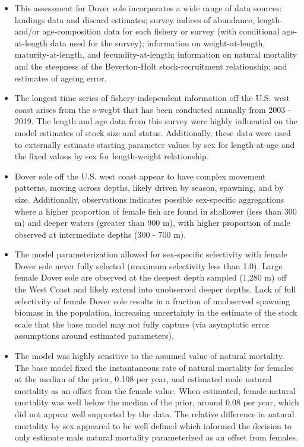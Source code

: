 \documentclass[11pt,
  english,
  a4paper,
]{article}
\begin{document}
\begin{itemize}

\item This assessment for Dover sole incorporates a wide range of data sources: landings data and discard estimates; survey indices of abundance, length- and/or age-composition data for each fishery or survey (with conditional age-at-length data used for the survey); information on weight-at-length, maturity-at-length, and fecundity-at-length; information on natural mortality and the steepness of the Beverton-Holt stock-recruitment relationship; and estimates of ageing error.

\item The longest time series of fishery-independent information off the U.S. west coast arises from the \gls{s-wcgbt} that has been conducted annually from 2003 - 2019. The length and age data from this survey were highly influential on the model estimates of stock size and status. Additionally, these data were used to externally estimate starting parameter values by sex for length-at-age and the fixed values by sex for length-weight relationship.   

\item Dover sole off the U.S. west coast appear to have complex movement patterns, moving across depths, likely driven by season, spawning, and by size. Additionally, observations indicates possible sex-specific aggregations where a higher proportion of female fish are found in shallower (less than 300 m) and deeper waters (greater than 900 m), with higher proportion of male observed at intermediate depths (300 - 700 m).

\item The model parameterization allowed for sex-specific selectivity with female Dover sole never fully selected (maximum selectivity less than 1.0). Large female Dover sole are observed at the deepest depth sampled (1,280 m) off the West Coast and likely extend into unobserved deeper depths. Lack of full selectivity of female Dover sole results in a fraction of unobserved spawning biomass in the population, increasing uncertainty in the estimate of the stock scale that the base model may not fully capture (via asymptotic error assumptions around estimated parameters).  

\item The model was highly sensitive to the assumed value of natural mortality.  The base model fixed the instantaneous rate of natural mortality for females at the median of the prior, 0.108 per year, and estimated male natural mortality as an offset from the female value. When estimated, female natural mortality was well below the median of the prior, around 0.08 per year, which did not appear well supported by the data.  The relative difference in natural mortality by sex appeared to be well defined which informed the decision to only estimate male natural mortality parameterized as an offset from females.   


\end{itemize}
\end{document}
